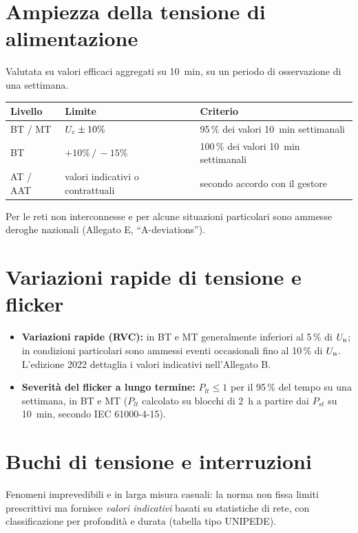 \section{Ampiezza della tensione di alimentazione}

Valutata su valori efficaci aggregati su \SI{10}{\minute}, su un periodo di osservazione
di una settimana.

\begin{table}[h]
\centering
\begin{tabular}{lll}
\toprule
\textbf{Livello} & \textbf{Limite} & \textbf{Criterio} \\
\midrule
BT / MT & $U_{\mathrm{c}} \pm 10\%$ & 95\,\% dei valori \SI{10}{\minute} settimanali \\
BT & $+10\%\,/\,-15\%$ & 100\,\% dei valori \SI{10}{\minute} settimanali \\
AT / AAT & valori indicativi o contrattuali & secondo accordo con il gestore \\
\bottomrule
\end{tabular}
\end{table}

\noindent
Per le reti non interconnesse e per alcune situazioni particolari sono ammesse
deroghe nazionali (Allegato E, ``A-deviations'').

\section{Variazioni rapide di tensione e flicker}

\begin{itemize}[itemsep=2pt]
  \item \textbf{Variazioni rapide (RVC):} in BT e MT generalmente inferiori al 5\,\% di $U_{\mathrm{n}}$;
        in condizioni particolari sono ammessi eventi occasionali fino al 10\,\% di $U_{\mathrm{n}}$.
        L'edizione 2022 dettaglia i valori indicativi nell'Allegato B.
  \item \textbf{Severità del flicker a lungo termine:} $P_{lt} \le 1$ per il 95\,\% del tempo
        su una settimana, in BT e MT ($P_{lt}$ calcolato su blocchi di \SI{2}{\hour}
        a partire dai $P_{st}$ su \SI{10}{\minute}, secondo IEC 61000-4-15).
\end{itemize}

\section{Buchi di tensione e interruzioni}

Fenomeni imprevedibili e in larga misura casuali: la norma non fissa limiti prescrittivi
ma fornisce \emph{valori indicativi} basati su statistiche di rete, con classificazione
per profondità e durata (tabella tipo UNIPEDE).

